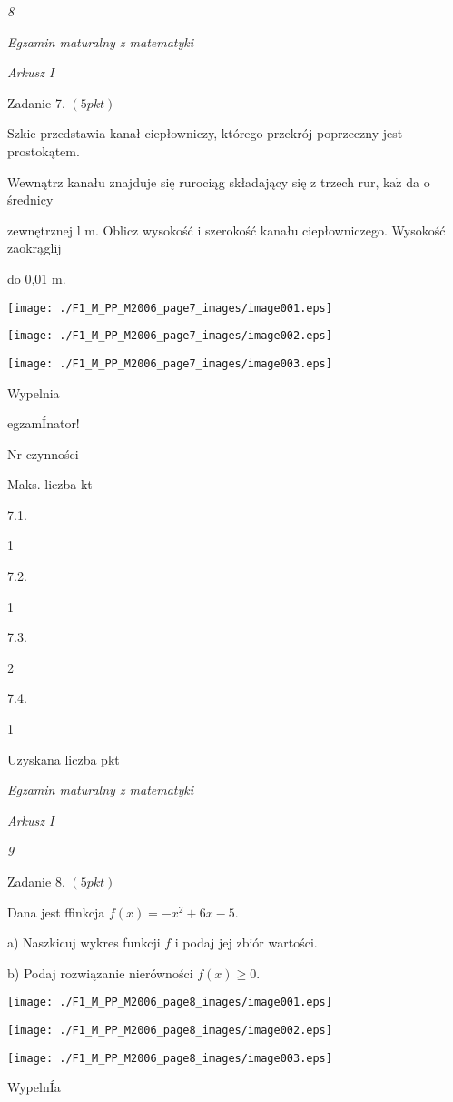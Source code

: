\documentclass[a4paper,12pt]{article}
\begin{document}
{\it 8}

{\it Egzamin maturalny z matematyki}

{\it Arkusz I}

Zadanie 7. $(5pkt)$

Szkic przedstawia kanał ciepłowniczy, którego przekrój poprzeczny jest prostokątem.

Wewnątrz kanału znajduje się rurociąg składający się z trzech rur, $\mathrm{k}\mathrm{a}\dot{\mathrm{z}}$ da o średnicy

zewnętrznej l $\mathrm{m}$. Oblicz wysokość i szerokość kanału ciepłowniczego. Wysokość zaokrąglij

do 0,01 $\mathrm{m}.$
\begin{center}
\texttt{[image: ./F1\_M\_PP\_M2006\_page7\_images/image001.eps]}

\texttt{[image: ./F1\_M\_PP\_M2006\_page7\_images/image002.eps]}

\texttt{[image: ./F1\_M\_PP\_M2006\_page7\_images/image003.eps]}
\end{center}
Wypelnia

egzamÍnator!

Nr czynności

Maks. liczba kt

7.1.

1

7.2.

1

7.3.

2

7.4.

1

Uzyskana liczba pkt





{\it Egzamin maturalny z matematyki}

{\it Arkusz I}

{\it 9}

Zadanie 8. $(5pkt)$

Dana jest ffinkcja $f(x) =-x^{2} +6x-5.$

a) Naszkicuj wykres funkcji $f$ i podaj jej zbiór wartości.

b) Podaj rozwiązanie nierówności $f(x)\geq 0.$
\begin{center}
\texttt{[image: ./F1\_M\_PP\_M2006\_page8\_images/image001.eps]}

\texttt{[image: ./F1\_M\_PP\_M2006\_page8\_images/image002.eps]}

\texttt{[image: ./F1\_M\_PP\_M2006\_page8\_images/image003.eps]}
\end{center}
WypelnÍa
\end{document}
